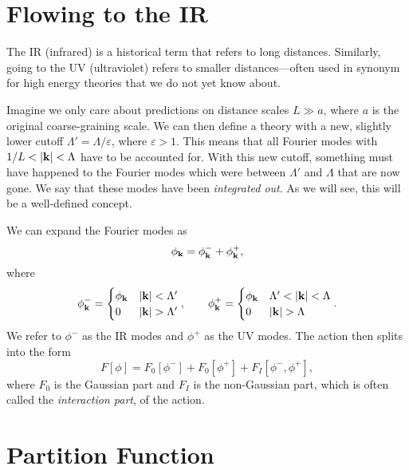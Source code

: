 \section{Flowing to the IR}%
\label{sec:flowing_to_the_ir}

The IR (infrared) is a historical term that refers to long distances.
Similarly, going to the UV (ultraviolet) refers to smaller distances---often used in synonym for high energy theories that we do not yet know about.

Imagine we only care about predictions on distance scales $L \gg a$, where $a$ is the original coarse-graining scale.
We can then define a theory with a new, slightly lower cutoff $\Lambda' = \Lambda/ \varepsilon$, where $\varepsilon > 1$. This means that all Fourier modes with $1 / L < \abs{\vb{k}} < \Lambda$ have to be accounted for.
With this new cutoff, something must have happened to the Fourier modes which were between $\Lambda'$ and $\Lambda$ that are now gone. We say that these modes have been \emph{integrated out}. As we will see, this will be a well-defined concept.

We can expand the Fourier modes as
\begin{equation}
  \phi_{\vb{k}} = \phi^-_{\vb{k}} + \phi^+_{\vb{k}},
\end{equation}
where
\begin{equation}
  \phi_{\vb{k}}^- =
  \begin{cases}
    \phi_{\vb{k}} & \abs{\vb{k}} < \Lambda' \\
    0 & \abs{\vb{k}} > \Lambda'
  \end{cases} ,
  \qquad
  \phi_{\vb{k}}^+ =
  \begin{cases}
    \phi_{\vb{k}} & \Lambda' < \abs{\vb{k}} < \Lambda \\
    0 & \abs{\vb{k}} > \Lambda
  \end{cases} .
\end{equation}
We refer to $\phi^-$ as the IR modes and $\phi^+$ as the UV modes.
The action then splits into the form
\begin{equation}
  F[\phi] = F_0 [\phi^-] + F_0 [\phi^+] + F_I [\phi^-, \phi^+],
\end{equation}
where $F_0$ is the Gaussian part and $F_I$ is the non-Gaussian part, which is often called the \emph{interaction part}, of the action.

\section{Partition Function}%
\label{sec:partition_function}

